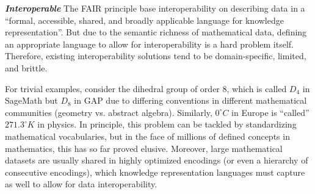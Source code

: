 \textbf{\emph{Interoperable}}
The FAIR principle base interoperability on describing data in a ``formal, accessible, shared, and broadly applicable language for knowledge representation''.
But due to the semantic richness of mathematical data, defining an appropriate language to allow for interoperability is a hard problem itself.
Therefore, existing interoperability solutions tend to be domain-specific, limited, and brittle.

For trivial examples, consider the dihedral group of order 8, which is called $D_4$ in SageMath but $D_8$ in GAP due to differing conventions in different mathematical communities (geometry vs. abstract algebra).
Similarly, $0^\circ C$ in Europe is ``called'' $271.3^\circ K$ in physics.
In principle, this problem can be tackled by standardizing mathematical vocabularies, but in the face of millions of defined concepts in mathematics, this has so far proved elusive.
Moreover, large mathematical datasets are usually shared in highly optimized encodings (or even a hierarchy of consecutive encodings), which knowledge representation languages must capture as well to allow for data interoperability.


